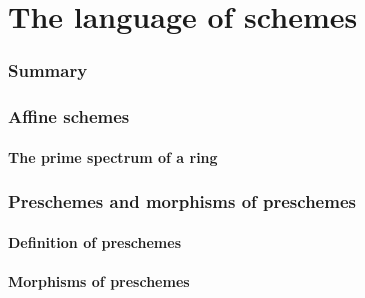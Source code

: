 \documentclass[10pt,oneside]{amsart}
\begin{document}
\clearpage


\setcounter{subsection}{0}
\part{The language of schemes}
    
    \section*{Summary}
    

    \section{Affine schemes}
       
       \subsection{The prime spectrum of a ring}

    \section{Preschemes and morphisms of preschemes}

        \subsection{Definition of preschemes}
        

        \subsection{Morphisms of preschemes}
        
\end{document}
